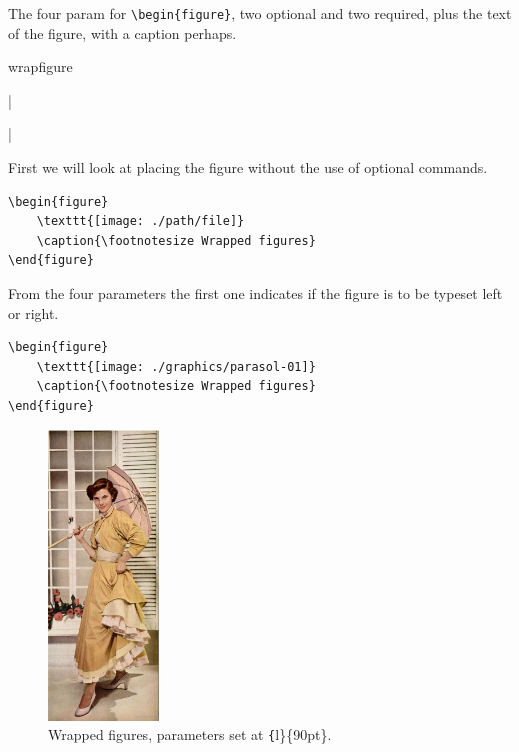 The four param
for \verb+\begin{figure}+, two optional and two required, plus the text of the figure, with a caption perhaps.

\begin{docCommand}{wrapfigure}{}
\end{docCommand}

|\begin{figure}\end{figure}|



First we will look at placing the figure without the use of optional commands.


\begin{verbatim}
\begin{figure}
    \texttt{[image: ./path/file]}
    \caption{\footnotesize Wrapped figures}
\end{figure}
\end{verbatim}

From the four parameters the first one indicates if the figure is to be typeset left or right.

\begin{verbatim}
\begin{figure}
    \texttt{[image: ./graphics/parasol-01]}
    \caption{\footnotesize Wrapped figures}
\end{figure}
\end{verbatim}


\begin{figure}
    \captionsetup{name=Fig.}
    \relax
    \includegraphics[width=83pt]{./images/parasol-01.jpg}
    \caption{Wrapped figures, parameters set at \texttt\{l\}\{90pt\}.}
\end{figure}

